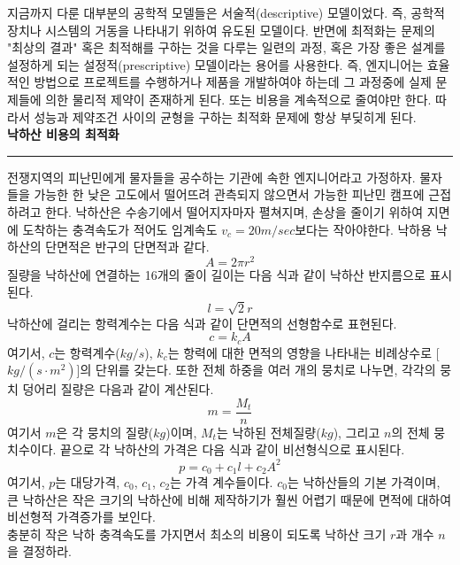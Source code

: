 지금까지 다룬 대부분의 공학적 모델들은 서술적(descriptive) 모델이었다. 즉, 공학적 장치나 시스템의 거동을 나타내기 위하여 유도된 모델이다. 반면에 최적화는 문제의 "최상의 결과" 혹은 최적해를 구하는 것을 다루는 일련의 과정, 혹은 가장 좋은 설계를 설정하게 되는 설정적(prescriptive) 모델이라는 용어를 사용한다. 즉, 엔지니어는 효율적인 방법으로 프로젝트를 수행하거나 제품을 개발하여야 하는데 그 과정중에 실제 문제들에 의한 물리적 제약이 존재하게 된다. 또는 비용을 계속적으로 줄여야만 한다. 따라서 성능과 제약조건 사이의 균형을 구하는 최적화 문제에 항상 부딪히게 된다.
\\
 \textbf{낙하산 비용의 최적화}\\
\rule{\textwidth}{0.1pt}
전쟁지역의 피난민에게 물자들을 공수하는 기관에 속한 엔지니어라고 가정하자. 물자들을 가능한 한 낮은 고도에서 떨어뜨려 관측되지 않으면서 가능한 피난민 캠프에 근접하려고 한다. 낙하산은 수송기에서 떨어지자마자 펼쳐지며, 손상을 줄이기 위하여 지면에 도착하는 충격속도가 적어도 임계속도 $v_{c}=20 m/sec$보다는 작아야한다. 낙하용 낙하산의 단면적은 반구의 단면적과 같다.
\begin{equation*}
A=2\pi r^2
\end{equation*}
질량을 낙하산에 연결하는 16개의 줄이 길이는 다음 식과 같이 낙하산 반지름으로 표시된다.
\begin{equation*}
l=\sqrt{2}r
\end{equation*}
낙하산에 걸리는 항력계수는 다음 식과 같이 단면적의 선형함수로 표현된다.
\begin{equation*}
c=k_{c}A
\end{equation*}
여기서, $c$는 항력계수($kg/s$), $k_{c}$는 항력에 대한 면적의 영향을 나타내는 비례상수로 [$kg/(s\cdot m^{2})$]의 단위를 갖는다. 또한 전체 하중을 여러 개의 뭉치로 나누면, 각각의 뭉치 덩어리 질량은 다음과 같이 계산된다.
\begin{equation*}
m=\frac{M_{t}}{n}
\end{equation*}
여기서 $m$은 각 뭉치의 질량($kg$)이며, $M_{t}$는 낙하된 전체질량($kg$), 그리고 $n$의 전체 뭉치수이다. 끝으로 각 낙하산의 가격은 다음 식과 같이 비선형식으로 표시된다.
\begin{equation*}
p=c_{0}+c_{1}l+c_{2}A^{2}
\end{equation*}
여기서, $p$는 대당가격, $c_{0}$, $c_{1}$, $c_{2}$는 가격 계수들이다. $c_{0}$는 낙하산들의 기본 가격이며, 큰 낙하산은 작은 크기의 낙하산에 비해 제작하기가 훨씬 어렵기 때문에 면적에 대하여 비선형적 가격증가를 보인다.\\충분히 작은 낙하 충격속도를 가지면서 최소의 비용이 되도록 낙하산 크기 $r$과 개수 $n$을 결정하라.\\
